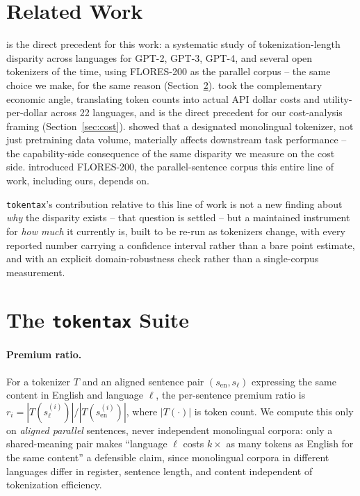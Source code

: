 \documentclass[11pt]{article}
\begin{document}
\section{Related Work}

\citet{petrov2023} is the direct precedent for this work: a systematic study
of tokenization-length disparity across languages for GPT-2, GPT-3, GPT-4,
and several open tokenizers of the time, using FLORES-200 as the parallel
corpus -- the same choice we make, for the same reason (Section~\ref{sec:methods}).
\citet{ahia2023} took the complementary economic angle, translating token
counts into actual API dollar costs and utility-per-dollar across 22
languages, and is the direct precedent for our cost-analysis framing
(Section~\ref{sec:cost}). \citet{rust2021} showed that a designated
monolingual tokenizer, not just pretraining data volume, materially affects
downstream task performance -- the capability-side consequence of the same
disparity we measure on the cost side. \citet{nllbteam2022} introduced
FLORES-200, the parallel-sentence corpus this entire line of work, including
ours, depends on.

\texttt{tokentax}'s contribution relative to this line of work is not a new
finding about \emph{why} the disparity exists -- that question is settled --
but a maintained instrument for \emph{how much} it currently is, built to be
re-run as tokenizers change, with every reported number carrying a
confidence interval rather than a bare point estimate, and with an explicit
domain-robustness check rather than a single-corpus measurement.

\section{The \texttt{tokentax} Suite}
\label{sec:methods}

\paragraph{Premium ratio.} For a tokenizer $T$ and an aligned sentence pair
$(s_{\mathrm{en}}, s_{\ell})$ expressing the same content in English and
language $\ell$, the per-sentence premium ratio is
$r_i = |T(s_\ell^{(i)})| / |T(s_{\mathrm{en}}^{(i)})|$, where $|T(\cdot)|$ is
token count. We compute this only on \emph{aligned parallel} sentences, never
independent monolingual corpora: only a shared-meaning pair makes ``language
$\ell$ costs $k\times$ as many tokens as English for the same content'' a
defensible claim, since monolingual corpora in different languages differ in
register, sentence length, and content independent of tokenization efficiency.
\end{document}
